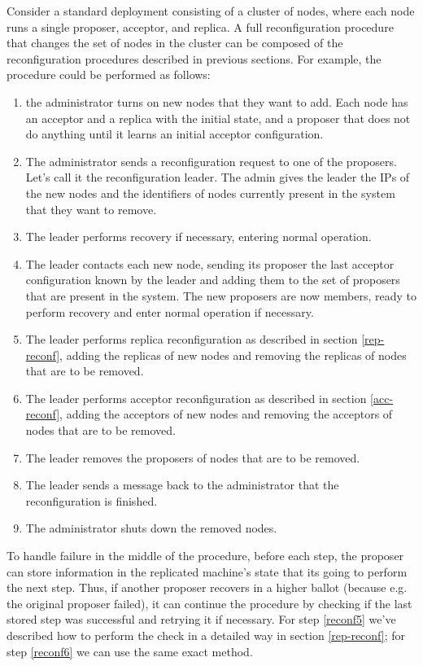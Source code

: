 \documentclass[12pt,a4paper,en]{pracamgr}
\begin{document}
Consider a standard deployment consisting of a cluster of nodes, where each node runs a single proposer, acceptor, and replica. A full reconfiguration procedure that changes the set of nodes in the cluster can be composed of the reconfiguration procedures described in previous sections. For example, the procedure could be performed as follows:
\begin{enumerate}
    \item the administrator turns on new nodes that they want to add. Each node has an acceptor and a replica with the initial state, and a proposer that does not do anything until it learns an initial acceptor configuration.
    \item The administrator sends a reconfiguration request to one of the proposers. Let's call it the reconfiguration leader. The admin gives the leader the IPs of the new nodes and the identifiers of nodes currently present in the system that they want to remove.
    \item The leader performs recovery if necessary, entering normal operation.
    \item The leader contacts each new node, sending its proposer the last acceptor configuration known by the leader and adding them to the set of proposers that are present in the system. The new proposers are now members, ready to perform recovery and enter normal operation if necessary.
    \item \label{reconf5} The leader performs replica reconfiguration as described in section \ref{rep-reconf}, adding the replicas of new nodes and removing the replicas of nodes that are to be removed.
    \item \label{reconf6} The leader performs acceptor reconfiguration as described in section \ref{acc-reconf}, adding the acceptors of new nodes and removing the acceptors of nodes that are to be removed.
    \item The leader removes the proposers of nodes that are to be removed.
    \item The leader sends a message back to the administrator that the reconfiguration is finished.
    \item The administrator shuts down the removed nodes.
\end{enumerate}

To handle failure in the middle of the procedure, before each step, the proposer can store information in the replicated machine's state that its going to perform the next step. Thus, if another proposer recovers in a higher ballot (because e.g. the original proposer failed), it can continue the procedure by checking if the last stored step was successful and retrying it if necessary. For step \ref{reconf5} we've described how to perform the check in a detailed way in section \ref{rep-reconf}; for step \ref{reconf6} we can use the same exact method.
\end{document}
